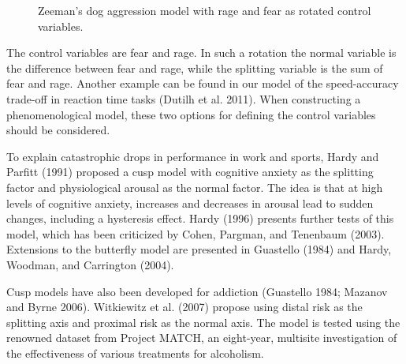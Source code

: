 \documentclass[
  a4paper,
  DIV=11,
  numbers=noendperiod,
  oneside]{scrreprt}
\begin{document}
\begin{figure}


\caption{\label{fig-ch3-img17-old-29}Zeeman's dog aggression model with
rage and fear as rotated control variables.}

\end{figure}%

The control variables are fear and rage. In such a rotation the normal
variable is the difference between fear and rage, while the splitting
variable is the sum of fear and rage. Another example can be found in
our model of the speed-accuracy trade-off in reaction time tasks (Dutilh
et al. 2011). When constructing a phenomenological model, these two
options for defining the control variables should be considered.

To explain catastrophic drops in performance in work and sports, Hardy
and Parfitt (1991) proposed a cusp model with cognitive anxiety as the
splitting factor and physiological arousal as the normal factor. The
idea is that at high levels of cognitive anxiety, increases and
decreases in arousal lead to sudden changes, including a hysteresis
effect. Hardy (1996) presents further tests of this model, which has
been criticized by Cohen, Pargman, and Tenenbaum (2003). Extensions to
the butterfly model are presented in Guastello (1984) and Hardy,
Woodman, and Carrington (2004).

Cusp models have also been developed for addiction (Guastello 1984;
Mazanov and Byrne 2006). Witkiewitz et al. (2007) propose using distal
risk as the splitting axis and proximal risk as the normal axis. The
model is tested using the renowned dataset from Project MATCH, an
eight-year, multisite investigation of the effectiveness of various
treatments for alcoholism.
\end{document}
